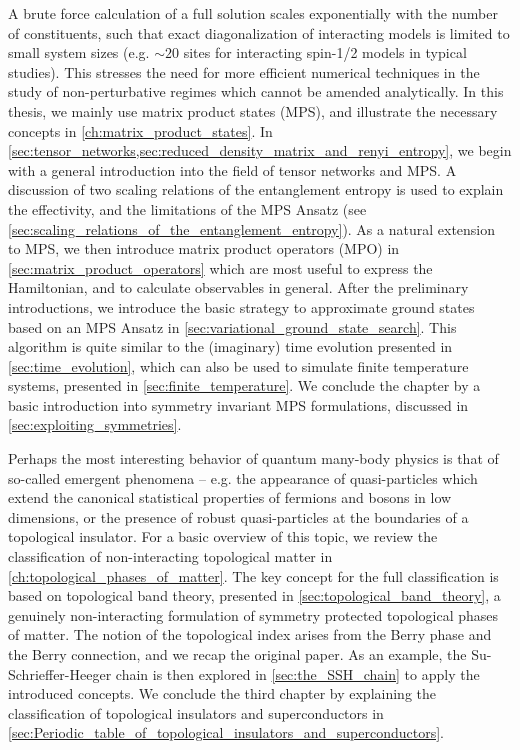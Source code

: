 A brute force calculation of a full solution scales exponentially with the number of constituents, such that exact diagonalization of interacting models is limited to small system sizes (e.g. $\sim 20$ sites for interacting spin-1/2 models in typical studies).
This stresses the need for more efficient numerical techniques in the study of non-perturbative regimes which cannot be amended analytically.
In this thesis, we mainly use matrix product states (MPS), and illustrate the necessary concepts in \cref{ch:matrix_product_states}.
In \cref{sec:tensor_networks,sec:reduced_density_matrix_and_renyi_entropy}, we begin with a general introduction into the field of tensor networks and MPS.
A discussion of two scaling relations of the entanglement entropy is used to explain the effectivity, and the limitations of the MPS Ansatz (see \cref{sec:scaling_relations_of_the_entanglement_entropy}).
As a natural extension to MPS, we then introduce matrix product operators (MPO) in \cref{sec:matrix_product_operators} which are most useful to express the Hamiltonian, and to calculate observables in general.
After the preliminary introductions, we introduce the basic strategy to approximate ground states based on an MPS Ansatz in \cref{sec:variational_ground_state_search}.
This algorithm is quite similar to the (imaginary) time evolution presented in \cref{sec:time_evolution}, which can also be used to simulate finite temperature systems, presented in \cref{sec:finite_temperature}.
We conclude the chapter by a basic introduction into symmetry invariant MPS formulations, discussed in \cref{sec:exploiting_symmetries}.

Perhaps the most interesting behavior of quantum many-body physics is that of so-called emergent phenomena -- e.g. the appearance of quasi-particles which extend the canonical statistical properties of fermions and bosons in low dimensions, or the presence of robust quasi-particles at the boundaries of a topological insulator.
For a basic overview of this topic, we review the classification of non-interacting topological matter in \cref{ch:topological_phases_of_matter}.
The key concept for the full classification is based on topological band theory, presented in \cref{sec:topological_band_theory}, a genuinely non-interacting formulation of symmetry protected topological phases of matter.
The notion of the topological index arises from the Berry phase and the Berry connection, and we recap the original paper.
As an example, the Su-Schrieffer-Heeger chain is then explored in \cref{sec:the_SSH_chain} to apply the introduced concepts.
We conclude the third chapter by explaining the classification of topological insulators and superconductors in \cref{sec:Periodic_table_of_topological_insulators_and_superconductors}.

